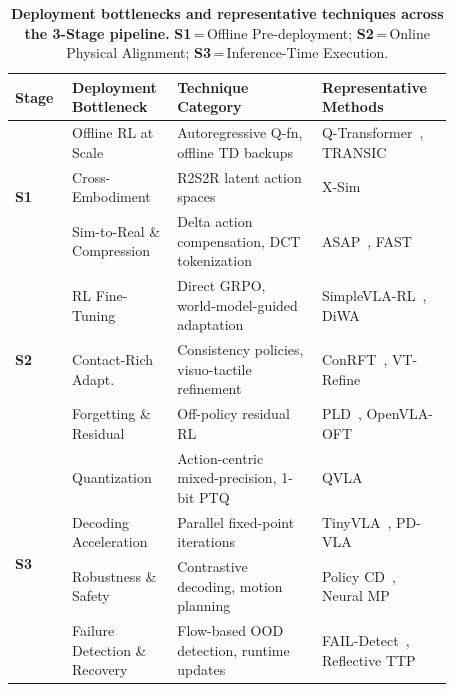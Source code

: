 \documentclass[acmsmall,screen,review]{acmart}
\begin{document}
\begin{table}[t]
\centering
\caption{\textbf{Deployment bottlenecks and representative techniques across the 3-Stage pipeline.}
\textbf{S1}\,=\,Offline Pre-deployment; \textbf{S2}\,=\,Online Physical Alignment; \textbf{S3}\,=\,Inference-Time Execution.}\label{tab:deployment_lifecycle}
\renewcommand{\arraystretch}{1.15}
\setlength{\tabcolsep}{3pt}
\scriptsize
\begin{tabular}{
  l
  p{0.24\linewidth}
  p{0.33\linewidth}
  p{0.30\linewidth}
}
\toprule
\textbf{Stage} & \textbf{Deployment Bottleneck} & \textbf{Technique Category} & \textbf{Representative Methods} \\
\midrule
\multirow{3}{*}{\textbf{S1}}
 & Offline RL at Scale & Autoregressive Q-fn, offline TD backups & Q-Transformer~\cite{chebotar2023qtransformer}, TRANSIC~\cite{jiang2025transic} \\
 & Cross-Embodiment & R2S2R latent action spaces & X-Sim~\cite{dan2025xsim} \\
 & Sim-to-Real \& Compression & Delta action compensation, DCT tokenization & ASAP~\cite{he2025asap}, FAST~\cite{pertsch2025fast} \\
\midrule
\multirow{3}{*}{\textbf{S2}}
 & RL Fine-Tuning & Direct GRPO, world-model-guided adaptation & SimpleVLA-RL~\cite{li2026simplevlarl}, DiWA~\cite{chandra2025diwa} \\
 & Contact-Rich Adapt. & Consistency policies, visuo-tactile refinement & ConRFT~\cite{chen2025conrft}, VT-Refine~\cite{huang2025vtrefine} \\
 & Forgetting \& Residual & Off-policy residual RL & PLD~\cite{xiao2025pld}, OpenVLA-OFT~\cite{kim2025oft} \\
\midrule
\multirow{4}{*}{\textbf{S3}}
 & Quantization & Action-centric mixed-precision, 1-bit PTQ & QVLA~\cite{xu2026qvla} \\
 & Decoding Acceleration & Parallel fixed-point iterations & TinyVLA~\cite{wen2025tinyvla}, PD-VLA~\cite{pdvla2025} \\
 & Robustness \& Safety & Contrastive decoding, motion planning & Policy CD~\cite{wu2026policycontrastive}, Neural MP~\cite{dalal2024neuralmp} \\
 & Failure Detection \& Recovery & Flow-based OOD detection, runtime updates & FAIL-Detect~\cite{xu2025detectfailures}, Reflective TTP~\cite{hong2026rttp} \\
\bottomrule
\end{tabular}
\end{table}
\end{document}
